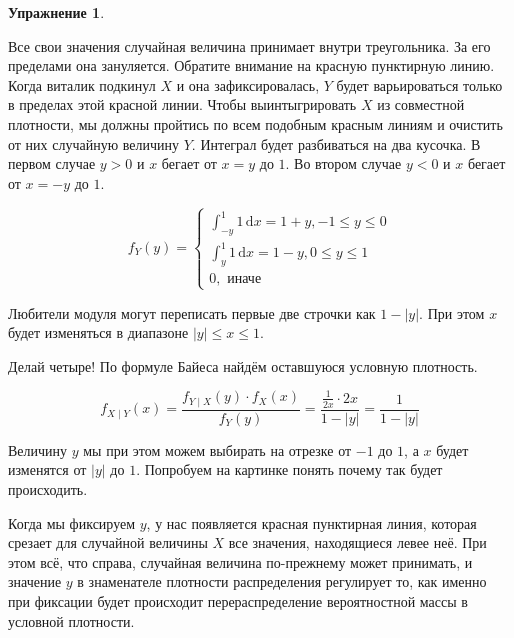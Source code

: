 \documentclass[12pt, a4paper, oneside]{extreport}
\newcommand{\dx}[1]{\,\mathrm{d}#1} %
\theoremstyle{plain}              %
\theoremstyle{definition}         %
\newtheorem{problem}{\color{myblue} Упражнение}
\begin{document}
\begin{problem}
\begin{sol}
Все свои значения случайная величина принимает внутри треугольника. За его пределами она зануляется. Обратите внимание на красную пунктирную линию. Когда виталик подкинул $X$ и она зафиксировалась, $Y$ будет варьироваться только в пределах этой красной линии. Чтобы выинтыгрировать $X$ из совместной плотности, мы должны пройтись по всем подобным красным линиям и очистить от них случайную величину $Y$.  Интеграл будет разбиваться на два кусочка. В первом случае $y > 0$ и $x$ бегает от $x = y$ до $1$. Во втором случае $ y < 0$ и $x$ бегает от $x = -y$ до $1$. 

\[ f_Y(y) = \begin{cases}\int_{-y}^1 1 \dx{x} = 1 + y, -1 \le y \le 0 \\ \int_{y}^1 1 \dx{x} = 1 - y, 0 \le y \le1 \\ 0, \text{ иначе} \end{cases} \] 

Любители модуля могут переписать первые две строчки как $ 1- |y|$. При этом $x$ будет изменяться в диапазоне $|y| \le x \le  1$.  

Делай четыре! По формуле Байеса найдём оставшуюся условную плотность. 

\[ f_{X \mid Y}(x) = \frac{f_{Y\mid X}(y) \cdot f_X(x)}{f_Y(y)} = \frac{\frac{1}{2x} \cdot 2x}{1 - |y|} = \frac{1}{1 - |y|} \]

Величину $y$ мы при этом можем выбирать на отрезке от $-1$ до $1$, а $x$ будет изменятся от $|y|$ до $1$. Попробуем на картинке понять почему так будет происходить.

\begin{center}
\end{center} 

Когда мы фиксируем $y$, у нас появляется красная пунктирная линия, которая срезает для случайной величины $X$ все значения, находящиеся левее неё. При этом всё, что справа, случайная величина по-прежнему может принимать, и значение $y$ в знаменателе плотности распределения регулирует то, как именно при фиксации будет происходит перераспределение вероятностной массы в условной плотности.
\end{sol} 
\end{problem}
\end{document}
